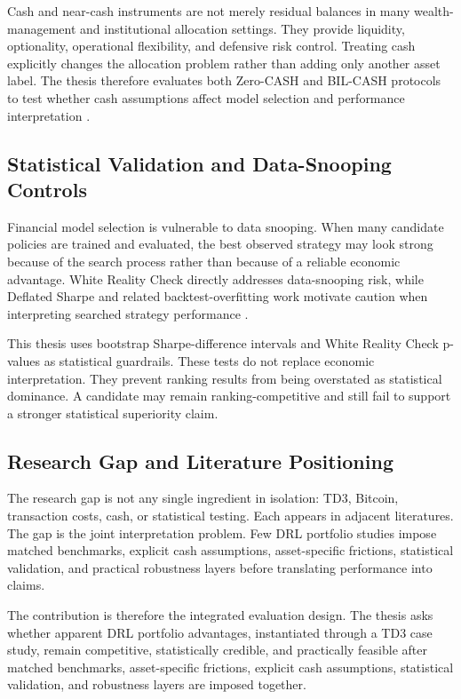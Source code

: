 \documentclass[12pt]{article}
\begin{document}
Cash and near-cash instruments are not merely residual balances in many wealth-management and institutional allocation settings. They provide liquidity, optionality, operational flexibility, and defensive risk control. Treating cash explicitly changes the allocation problem rather than adding only another asset label. The thesis therefore evaluates both Zero-CASH and BIL-CASH protocols to test whether cash assumptions affect model selection and performance interpretation \citep{simutin2014}.

\subsection{Statistical Validation and Data-Snooping Controls}

Financial model selection is vulnerable to data snooping. When many candidate policies are trained and evaluated, the best observed strategy may look strong because of the search process rather than because of a reliable economic advantage. White Reality Check directly addresses data-snooping risk, while Deflated Sharpe and related backtest-overfitting work motivate caution when interpreting searched strategy performance \citep{white2000,bailey2014,lopezdeprado2020mlam}.

This thesis uses bootstrap Sharpe-difference intervals and White Reality Check p-values as statistical guardrails. These tests do not replace economic interpretation. They prevent ranking results from being overstated as statistical dominance. A candidate may remain ranking-competitive and still fail to support a stronger statistical superiority claim.

\subsection{Research Gap and Literature Positioning}

The research gap is not any single ingredient in isolation: TD3, Bitcoin, transaction costs, cash, or statistical testing. Each appears in adjacent literatures. The gap is the joint interpretation problem. Few DRL portfolio studies impose matched benchmarks, explicit cash assumptions, asset-specific frictions, statistical validation, and practical robustness layers before translating performance into claims.

The contribution is therefore the integrated evaluation design. The thesis asks whether apparent DRL portfolio advantages, instantiated through a TD3 case study, remain competitive, statistically credible, and practically feasible after matched benchmarks, asset-specific frictions, explicit cash assumptions, statistical validation, and robustness layers are imposed together.
\end{document}
